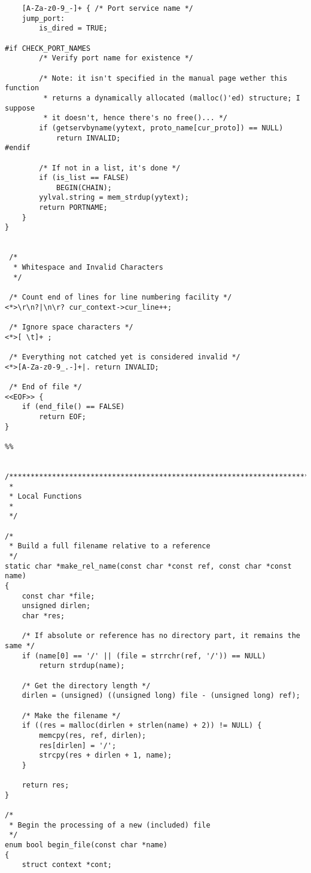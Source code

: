 \documentclass[a4paper,landscape,twocolumn,11pt]{article}
\begin{document}
{\begin{verbatim}
    [A-Za-z0-9_-]+ { /* Port service name */
    jump_port:
        is_dired = TRUE;

#if CHECK_PORT_NAMES
        /* Verify port name for existence */

        /* Note: it isn't specified in the manual page wether this function
         * returns a dynamically allocated (malloc()'ed) structure; I suppose
         * it doesn't, hence there's no free()... */
        if (getservbyname(yytext, proto_name[cur_proto]) == NULL)
            return INVALID;
#endif

        /* If not in a list, it's done */
        if (is_list == FALSE)
            BEGIN(CHAIN);
        yylval.string = mem_strdup(yytext);
        return PORTNAME;
    }
}


 /*
  * Whitespace and Invalid Characters
  */

 /* Count end of lines for line numbering facility */
<*>\r\n?|\n\r? cur_context->cur_line++;

 /* Ignore space characters */
<*>[ \t]+ ;

 /* Everything not catched yet is considered invalid */
<*>[A-Za-z0-9_.-]+|. return INVALID;

 /* End of file */
<<EOF>> {
    if (end_file() == FALSE)
        return EOF;
}

%%


/*****************************************************************************
 *
 * Local Functions
 *
 */

/*
 * Build a full filename relative to a reference
 */
static char *make_rel_name(const char *const ref, const char *const name)
{
    const char *file;
    unsigned dirlen;
    char *res;

    /* If absolute or reference has no directory part, it remains the same */
    if (name[0] == '/' || (file = strrchr(ref, '/')) == NULL)
        return strdup(name);

    /* Get the directory length */
    dirlen = (unsigned) ((unsigned long) file - (unsigned long) ref);

    /* Make the filename */
    if ((res = malloc(dirlen + strlen(name) + 2)) != NULL) {
        memcpy(res, ref, dirlen);
        res[dirlen] = '/';
        strcpy(res + dirlen + 1, name);
    }

    return res;
}

/*
 * Begin the processing of a new (included) file
 */
enum bool begin_file(const char *name)
{
    struct context *cont;


\end{verbatim}}
\end{document}
